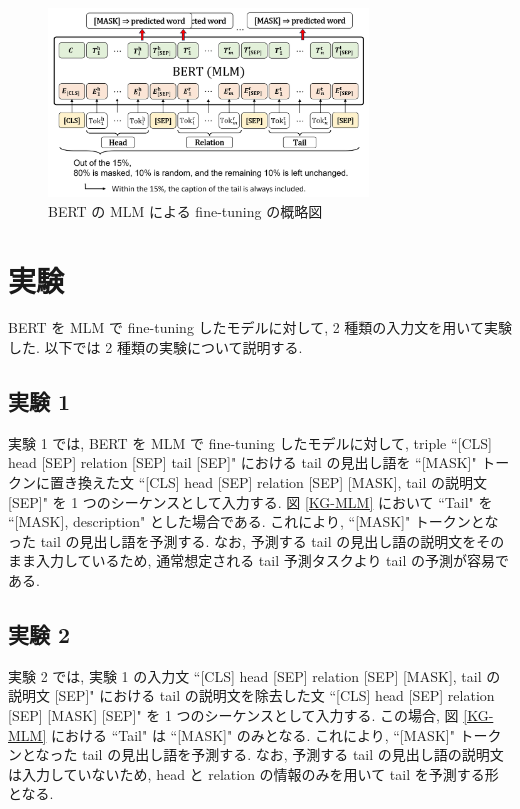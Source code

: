 \documentclass[twocolumn]{jarticle}
\begin{document}
\begin{figure}[t]
    \centering
    \includegraphics[width=85mm]{assets/MLM_fine-tuning_English.png}
    \vspace{-5mm}
    \caption{BERT の MLM による fine-tuning の概略図}
    \label{MLM_fine_tuning}
\end{figure}

\vspace{-1mm}
\section{実験}

BERT を MLM で fine-tuning したモデルに対して, 2 種類の入力文を用いて実験した. 以下では 2 種類の実験について説明する. 

\vspace{-1mm}
\subsection{実験 1}

実験 1 では, BERT を MLM で fine-tuning したモデルに対して, triple ``[CLS] head [SEP] relation [SEP] tail [SEP]" における tail の見出し語を ``[MASK]" トークンに置き換えた文 ``[CLS] head [SEP] relation [SEP] [MASK], tail の説明文 [SEP]" を 1 つのシーケンスとして入力する. 図 \ref{KG-MLM} において ``Tail" を ``[MASK], description" とした場合である. これにより, ``[MASK]" トークンとなった tail の見出し語を予測する. なお, 予測する tail の見出し語の説明文をそのまま入力しているため, 通常想定される tail 予測タスクより tail の予測が容易である.

\vspace{-1mm}
\subsection{実験 2}

実験 2 では, 実験 1 の入力文 ``[CLS] head [SEP] relation [SEP] [MASK], tail の説明文 [SEP]" における tail の説明文を除去した文 ``[CLS] head [SEP] relation [SEP] [MASK] [SEP]" を 1 つのシーケンスとして入力する. この場合, 図 \ref{KG-MLM} における ``Tail" は ``[MASK]" のみとなる. これにより, ``[MASK]" トークンとなった tail の見出し語を予測する. なお, 予測する tail の見出し語の説明文は入力していないため, head と relation の情報のみを用いて tail を予測する形となる. \par
\end{document}
